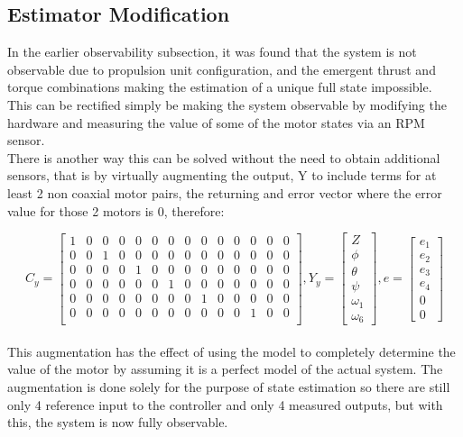 \documentclass[12pt,a4paper,twoside]{report}
\begin{document}
			\subsection{Estimator Modification}
			
				In the earlier observability subsection, it was found that the system is not observable due to propulsion unit configuration, and the emergent thrust and torque combinations making the estimation of a unique full state impossible.
				\\
				This can be rectified simply be making the system observable by modifying the hardware and measuring the value of some of the motor states via an RPM sensor.
				\\
				There is another way this can be solved without the need to obtain additional sensors, that is by virtually augmenting the output, Y to include terms for at least 2 non coaxial motor pairs, the returning and error vector where the error value for those 2 motors is 0,  therefore:
				
				\setcounter{MaxMatrixCols}{15}
				\begin{equation}
					C_y =
					\begin{bmatrix}
						1&0&0&0&0&0&0&0&0&0&0&0&0&0 \\
						0&0&1&0&0&0&0&0&0&0&0&0&0&0 \\
						0&0&0&0&1&0&0&0&0&0&0&0&0&0 \\
						0&0&0&0&0&0&1&0&0&0&0&0&0&0 \\
						0&0&0&0&0&0&0&0&1&0&0&0&0&0 \\
						0&0&0&0&0&0&0&0&0&0&0&1&0&0 \\
					\end{bmatrix}  
					,
					Y_y =
					\begin{bmatrix}
						Z \\
						\phi\\
						\theta\\
						\psi\\
						\omega_1\\
						\omega_6
					\end{bmatrix}
					,
					e =
					\begin{bmatrix}
						e_1 \\
						e_2\\
						e_3\\
						e_4\\
						0\\
						0
					\end{bmatrix}
				\end{equation}
				\\
				This augmentation has the effect of using the model to completely determine the value of the motor by assuming it is a perfect model of the actual system. The augmentation is done solely for the purpose of state estimation so there are still only 4 reference input to the controller and only 4 measured outputs, but with this, the system is now fully observable.
				
\end{document}
